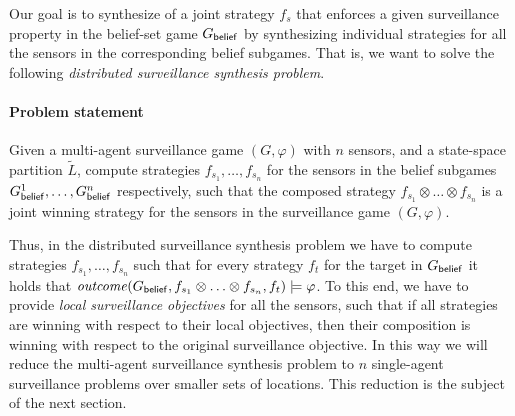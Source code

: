 
Our goal is to synthesize of a joint strategy $f_s$ that enforces a given surveillance property in the belief-set game $G_{\mathsf{belief}}$ by synthesizing individual strategies for all the sensors in the corresponding belief subgames. That is, we want to solve the following \emph{distributed surveillance synthesis problem}. 
 
\paragraph*{\textbf{Problem statement }}Given a multi-agent surveillance game $(G,\varphi)$ with $n$ sensors, and a state-space partition $\widetilde{L}$, compute strategies $f_{s_1},\ldots,f_{s_n}$ for the sensors in the belief subgames $G^1_{\mathsf{belief}},\ldots,G^n_{\mathsf{belief}}$ respectively, such that the composed strategy $f_{s_1}\otimes\ldots\otimes f_{s_n}$ is a joint winning strategy for the sensors in the surveillance game $(G,\varphi)$.

\smallskip

Thus, in the distributed surveillance synthesis problem we have to compute strategies $f_{s_1},\ldots,f_{s_n}$  such that for every strategy $f_t$ for the target in $G_{\mathsf{belief}}$ it holds that $\mathit{outcome}(G_{\mathsf{belief}},f_{s_1}\otimes\ldots\otimes f_{s_n},f_{t}) \models \varphi$. To this end, we have to provide \emph{local surveillance objectives} for all the sensors, such that if all strategies are winning with respect to their local objectives, then their composition is winning with respect to the original surveillance objective. In this way we will reduce the multi-agent surveillance synthesis problem to $n$ single-agent surveillance problems over smaller sets of locations. This reduction is the subject of the next section.



